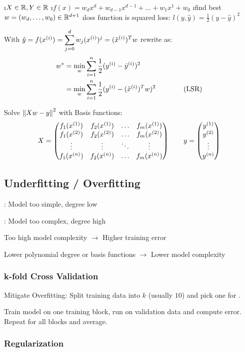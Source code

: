 \bi
\i $X \in \mathbb{R}, Y \in \mathbb{R}$
\i $f(x) = w_dx^d + w_{d-1}x^{d-1} + \ldots + w_1x^1 + w_0$
\i find best $w = (w_d, \ldots, w_0) \in \mathbb{R}^{d+1}$
\i loss function is squared loss: $l(y, \hat y) = \frac{1}{2}(y - \hat y)^2$
\ei

\begin{samepage}
With $\hat y = f(x^{(i)}) = \displaystyle\sum^d_{j=0}w_j (x^{(i)})^j = (\tilde x ^{(i)})^T w$ rewrite as:
\begin{align*}
  w^* &= \min_w \displaystyle\sum^n_{i=1}\frac{1}{2}(y^{(i)} - \hat y^{(i)})^2\\
  &= \min_w \displaystyle\sum^n_{i=1}\frac{1}{2}(y^{(i)} - (\tilde x ^{(i)})^T w)^2 \text{\qquad\qquad (LSR)}
\end{align*}
\end{samepage}

Solve $\left\lVert Xw-y\right\rVert^2$ with Basis functions:
\[
X = \begin{pmatrix} f_1(x^{(1)}) & f_2(x^{(1)}) & \ldots & f_m(x^{(1)})\\
f_1(x^{(2)}) & f_2(x^{(2)}) & \ldots & f_m(x^{(2)})\\
\vdots & \vdots & \ddots & \vdots\\
f_1(x^{(n)}) & f_2(x^{(n)}) & \ldots & f_m(x^{(n)}) \end{pmatrix} \qquad y = \begin{pmatrix} y^{(1)}\\y^{(2)}\\\vdots\\y^{(n)} \end{pmatrix}
\]

\subsection{Underfitting / Overfitting}

: Model too simple, degree low

: Model too complex, degree high

Too high model complexity $\to$ Higher training error

Lower polynomial degree or basis functions $\to$ Lower model complexity

\subsubsection{k-fold Cross Validation}

Mitigate Overfitting: Split training data into $k$ (usually $10$) and pick one for .

Train model on one training block, run on validation data and compute error. Repeat for all blocks and average.

\subsubsection{Regularization}

